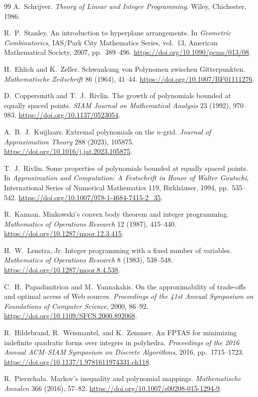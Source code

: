 \documentclass[final,5p,times,twocolumn]{elsarticle}
\theoremstyle{definition}\newtheorem{definition}{Definition}[section]
\theoremstyle{remark}\newtheorem{remark}[theorem]{Remark}
\begin{document}
\begin{thebibliography}{99}
 A.~Schrijver.
\emph{Theory of Linear and Integer Programming}. Wiley, Chichester, 1986.

 R.~P.~Stanley.
An introduction to hyperplane arrangements.
In \emph{Geometric Combinatorics}, IAS/Park City Mathematics Series, vol.~13,
American Mathematical Society, 2007, pp.~389--496.
\url{https://doi.org/10.1090/pcms/013/08}.

 H.~Ehlich and K.~Zeller.
Schwankung von Polynomen zwischen Gitterpunkten.
\emph{Mathematische Zeitschrift} 86 (1964), 41--44.
\url{https://doi.org/10.1007/BF01111276}.

 D.~Coppersmith and T.~J.~Rivlin.
The growth of polynomials bounded at equally spaced points.
\emph{SIAM Journal on Mathematical Analysis} 23 (1992), 970--983.
\url{https://doi.org/10.1137/0523054}.

 A.~B.~J.~Kuijlaars.
Extremal polynomials on the $n$-grid.
\emph{Journal of Approximation Theory} 288 (2023), 105875.
\url{https://doi.org/10.1016/j.jat.2023.105875}.

 T.~J.~Rivlin.
Some properties of polynomials bounded at equally spaced points.
In \emph{Approximation and Computation: A Festschrift in Honor of Walter Gautschi},
International Series of Numerical Mathematics 119, Birkh\"auser, 1994, pp.~535--542.
\url{https://doi.org/10.1007/978-1-4684-7415-2_35}.

 R.~Kannan.
Minkowski's convex body theorem and integer programming.
\emph{Mathematics of Operations Research} 12 (1987), 415--440.
\url{https://doi.org/10.1287/moor.12.3.415}.

 H.~W.~Lenstra, Jr.
Integer programming with a fixed number of variables.
\emph{Mathematics of Operations Research} 8 (1983), 538--548.
\url{https://doi.org/10.1287/moor.8.4.538}.

 C.~H.~Papadimitriou and M.~Yannakakis.
On the approximability of trade-offs and optimal access of Web sources.
\emph{Proceedings of the 41st Annual Symposium on Foundations of Computer Science}, 2000, 86--92.
\url{https://doi.org/10.1109/SFCS.2000.892068}.

 R.~Hildebrand, R.~Weismantel, and K.~Zemmer.
An FPTAS for minimizing indefinite quadratic forms over integers in polyhedra.
\emph{Proceedings of the 2016 Annual ACM--SIAM Symposium on Discrete Algorithms}, 2016, pp.~1715--1723.
\url{https://doi.org/10.1137/1.9781611974331.ch118}.

 R.~Pierzcha\l a. Markov's inequality and polynomial mappings.
\emph{Mathematische Annalen} 366 (2016), 57--82.
\url{https://doi.org/10.1007/s00208-015-1294-9}.

\end{thebibliography}
\end{document}
